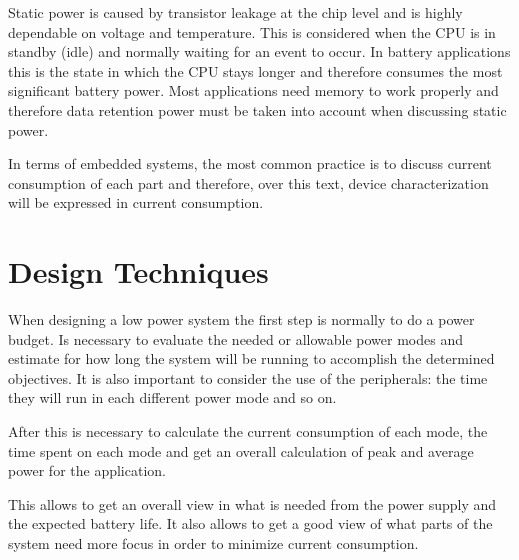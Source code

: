 \documentclass[11pt,a4paper]{report}
\begin{document}
Static power is caused by transistor leakage at the chip level and is highly dependable on voltage and temperature. This is considered when the CPU is in standby (idle) and normally waiting for an event to occur. In battery applications this is the state in which the CPU stays longer and therefore consumes the most significant battery power. Most applications need memory to work properly and therefore data retention power must be taken into account when discussing static power.
 
In terms of embedded systems, the most common practice is to discuss current consumption of each part and therefore, over this text, device characterization will be expressed in current consumption. 

\section{Design Techniques}

When designing a low power system the first step is normally to do a power budget. Is necessary to evaluate
the needed or allowable power modes and estimate for how long the system will be running to accomplish the determined objectives. It is also important to consider the use of the peripherals: the time they will run in each different power mode and so on.

After this is necessary to calculate the current consumption of each mode, the time spent on each mode and get an overall calculation of peak and average power for the application.

This allows to get an overall view in what is needed from the power supply and the expected battery life. It also allows to get a good view of what parts of the system need more focus in order to minimize current consumption.




\end{document}
